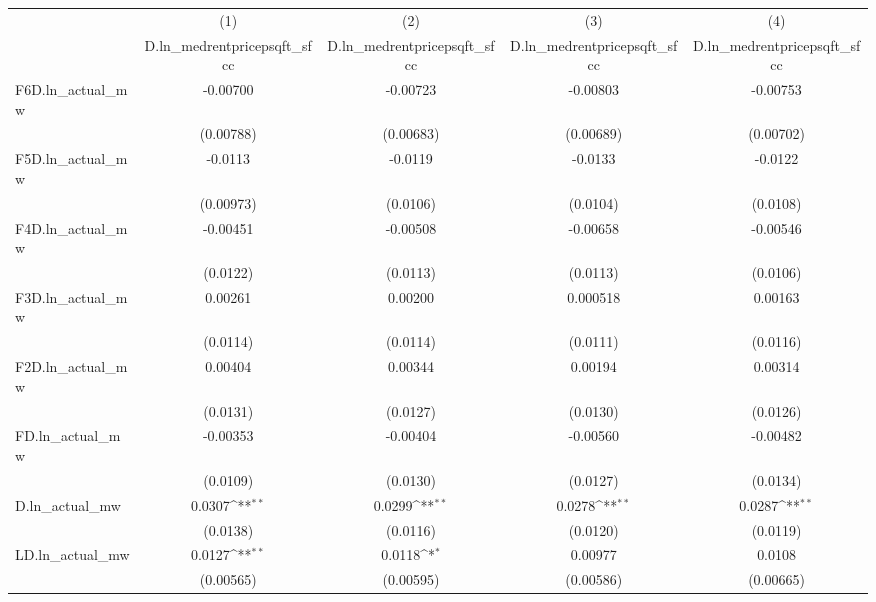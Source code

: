 {
\def\sym#1{\ifmmode^{#1}\else\(^{#1}\)\fi}
\begin{tabular}{l*{4}{c}}
\hline\hline
          &\multicolumn{1}{c}{(1)}&\multicolumn{1}{c}{(2)}&\multicolumn{1}{c}{(3)}&\multicolumn{1}{c}{(4)}\\
          &\multicolumn{1}{c}{D.ln\_medrentpricepsqft\_sfcc}&\multicolumn{1}{c}{D.ln\_medrentpricepsqft\_sfcc}&\multicolumn{1}{c}{D.ln\_medrentpricepsqft\_sfcc}&\multicolumn{1}{c}{D.ln\_medrentpricepsqft\_sfcc}\\
\hline
F6D.ln\_actual\_mw& -0.00700         & -0.00723         & -0.00803         & -0.00753         \\
          &(0.00788)         &(0.00683)         &(0.00689)         &(0.00702)         \\
[1em]
F5D.ln\_actual\_mw&  -0.0113         &  -0.0119         &  -0.0133         &  -0.0122         \\
          &(0.00973)         & (0.0106)         & (0.0104)         & (0.0108)         \\
[1em]
F4D.ln\_actual\_mw& -0.00451         & -0.00508         & -0.00658         & -0.00546         \\
          & (0.0122)         & (0.0113)         & (0.0113)         & (0.0106)         \\
[1em]
F3D.ln\_actual\_mw&  0.00261         &  0.00200         & 0.000518         &  0.00163         \\
          & (0.0114)         & (0.0114)         & (0.0111)         & (0.0116)         \\
[1em]
F2D.ln\_actual\_mw&  0.00404         &  0.00344         &  0.00194         &  0.00314         \\
          & (0.0131)         & (0.0127)         & (0.0130)         & (0.0126)         \\
[1em]
FD.ln\_actual\_mw& -0.00353         & -0.00404         & -0.00560         & -0.00482         \\
          & (0.0109)         & (0.0130)         & (0.0127)         & (0.0134)         \\
[1em]
D.ln\_actual\_mw&   0.0307\sym{**} &   0.0299\sym{**} &   0.0278\sym{**} &   0.0287\sym{**} \\
          & (0.0138)         & (0.0116)         & (0.0120)         & (0.0119)         \\
[1em]
LD.ln\_actual\_mw&   0.0127\sym{**} &   0.0118\sym{*}  &  0.00977         &   0.0108         \\
          &(0.00565)         &(0.00595)         &(0.00586)         &(0.00665)         \\

\end{tabular}}
